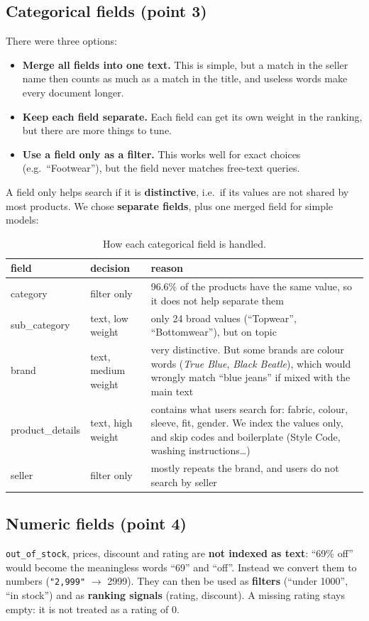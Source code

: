 \documentclass[11pt,a4paper]{article}
\begin{document}
\subsection{Categorical fields (point 3)}
There were three options:
\begin{itemize}
  \item \textbf{Merge all fields into one text.} This is simple, but a match in the seller name then counts as much as a
        match in the title, and useless words make every document longer.
  \item \textbf{Keep each field separate.} Each field can get its own weight in the ranking, but there are more things to tune.
  \item \textbf{Use a field only as a filter.} This works well for exact choices (e.g.\ ``Footwear''), but the field
        never matches free-text queries.
\end{itemize}
A field only helps search if it is \textbf{distinctive}, i.e.\ if its values are not shared by most products.
We chose \textbf{separate fields}, plus one merged field for simple models:

\begin{table}[H]
\centering\small
\begin{tabularx}{\textwidth}{@{}l l Y@{}}
\toprule
field & decision & reason\\
\midrule
category & filter only & 96.6\% of the products have the same value, so it does not help separate them\\
sub\_category & text, low weight & only 24 broad values (``Topwear'', ``Bottomwear''), but on topic\\
brand & text, medium weight & very distinctive. But some brands are colour words (\emph{True Blue}, \emph{Black Beatle}),
which would wrongly match ``blue jeans'' if mixed with the main text\\
product\_details & text, high weight & contains what users search for: fabric, colour, sleeve, fit, gender.
We index the values only, and skip codes and boilerplate (Style Code, washing instructions\ldots)\\
seller & filter only & mostly repeats the brand, and users do not search by seller\\
\bottomrule
\end{tabularx}
\caption{How each categorical field is handled.}
\end{table}

\subsection{Numeric fields (point 4)}
\texttt{out\_of\_stock}, prices, discount and rating are \textbf{not indexed as text}: ``69\% off'' would become the
meaningless words ``69'' and ``off''. Instead we convert them to numbers (\texttt{"2,999"} $\to$ 2999). They can then
be used as \textbf{filters} (``under 1000'', ``in stock'') and as \textbf{ranking signals} (rating, discount).
A missing rating stays empty: it is not treated as a rating of 0.
\end{document}
